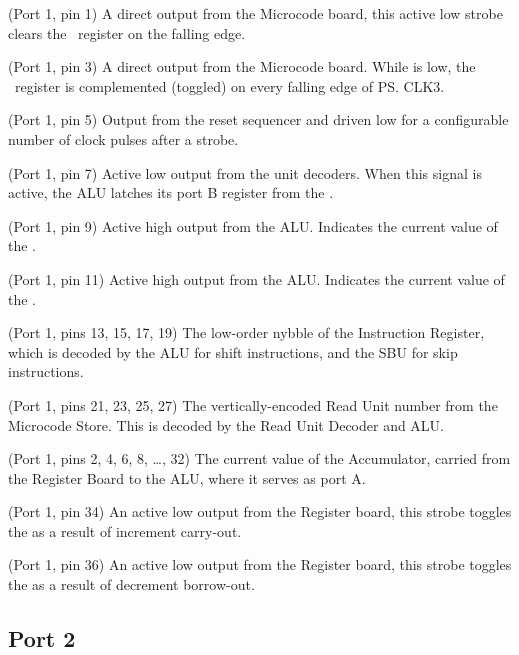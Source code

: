 \begin{description}

 (Port 1, pin 1) A direct output from the Microcode board, this
active low strobe clears the \Lreg~register on the falling edge.

 (Port 1, pin 3) A direct output from the Microcode board. While
 is low, the \Lreg~register is complemented (toggled) on every falling
edge of \ps{CLK3}.

 (Port 1, pin 5) Output from the reset sequencer and driven
low for a configurable number of clock pulses after a  strobe.

 (Port 1, pin 7) Active low output from the unit decoders. When
this signal is active, the ALU latches its port B register from the \IBUS.

 (Port 1, pin 9) Active high output from the ALU. Indicates the
current value of the \Lreg.

 (Port 1, pin 11) Active high output from the ALU. Indicates the
current value of the \Vreg.

 (Port 1, pins 13, 15, 17, 19) The low-order nybble of
the Instruction Register, which is decoded by the \unit{ALU} for shift
instructions, and the \unit{SBU} for skip instructions.

 (Port 1, pins 21, 23, 25, 27) The
vertically-encoded Read Unit number from the Microcode Store. This is decoded
by the Read Unit Decoder and ALU.

 (Port 1, pins 2, 4, 6, 8, \ldots, 32) The current
value of the Accumulator, carried from the Register Board to the ALU, where it
serves as port A.

 (Port 1, pin 34) An active low output from the Register board,
this strobe toggles the \Lreg as a result of \AC{} increment carry-out.

 (Port 1, pin 36) An active low output from the Register board,
this strobe toggles the \Lreg as a result of \AC{} decrement borrow-out.

\end{description}

\foobarbaz

\subsection{Port 2}

